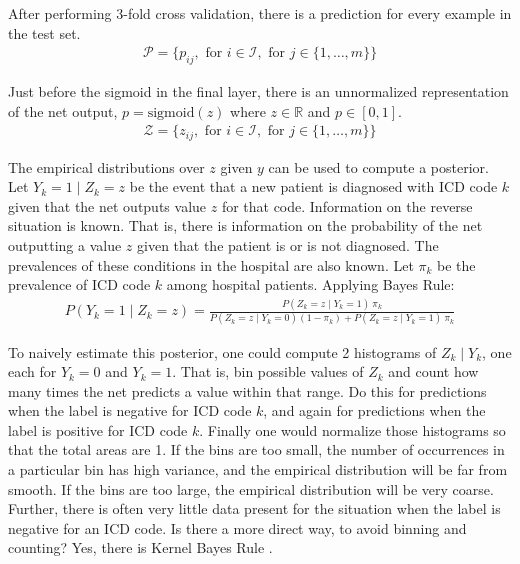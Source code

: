 After performing 3-fold cross validation, there is a prediction for every example in the test set.
\begin{gather}
    \mathcal{P} = \{
        p_{ij},
        \text{ for } i \in \mathcal{I},
        \text{ for } j \in \{ 1, \dots, m \}
    \}
\end{gather}

Just before the sigmoid in the final layer, there is an unnormalized representation of the net output, $p = \text{sigmoid}(z)$ where $z \in \mathbb{R}$ and $p \in [0, 1]$.
\begin{gather}
    \mathcal{Z} = \{
        z_{ij},
        \text{ for } i \in \mathcal{I},
        \text{ for } j \in \{ 1, \dots, m \}
    \}
\end{gather}

The empirical distributions over $z$ given $y$ can be used to compute a posterior.  Let $Y_k = 1 \mid Z_k = z$ be the event that a new patient is diagnosed with ICD code $k$ given that the net outputs value $z$ for that code.  Information on the reverse situation is known.  That is, there is information on the probability of the net outputting a value $z$ given that the patient is or is not diagnosed.  The prevalences of these conditions in the hospital are also known.  Let $\pi_k$ be the prevalence of ICD code $k$ among hospital patients.  Applying Bayes Rule:
\begin{gather}
    P(Y_k = 1 \mid Z_k = z) = \frac
        {P(Z_k = z \mid Y_k = 1) \ \pi_k}
        {P(Z_k = z \mid Y_k = 0) (1 - \pi_k) + P(Z_k = z \mid Y_k = 1) \ \pi_k}
\end{gather}

To naively estimate this posterior, one could compute 2 histograms of $Z_k \mid Y_k$, one each for $Y_k=0$ and $Y_k=1$.  That is, bin possible values of $Z_k$ and count how many times the net predicts a value within that range.  Do this for predictions when the label is negative for ICD code $k$, and again for predictions when the label is positive for ICD code $k$.  Finally one would normalize those histograms so that the total areas are 1.  If the bins are too small, the number of occurrences in a particular bin has high variance, and the empirical distribution will be far from smooth.  If the bins are too large, the empirical distribution will be very coarse.  Further, there is often very little data present for the situation when the label is negative for an ICD code.  Is there a more direct way, to avoid binning and counting?  Yes, there is Kernel Bayes Rule \cite{fukumizu2013kernel}.  

